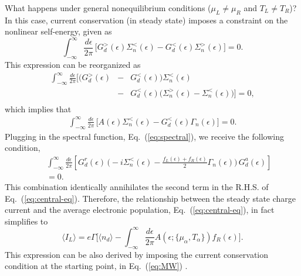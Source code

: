 \documentclass[aps,pra,twocolumn,groupedaddress,showpacs,superscriptaddress,amssymb,amsmath]{revtex4-1}
\newcommand{\be}{\begin{equation}}
\newcommand{\ee}{\end{equation}}
\newcommand{\bea}{\begin{eqnarray}}
\newcommand{\eea}{\end{eqnarray}}
\begin{document}
What happens under general nonequilibrium conditions ($\mu_L \!\neq\! \mu_R$ and $T_L \neq T_R$)? 
In this case, current conservation (in steady state) imposes a constraint on the nonlinear self-energy, 
given as \cite{Haug-book}
%
\be
\!\!\int_{-\infty}^{\infty} \frac{d\epsilon}{2\pi} \, \Big[G_d^{>}(\epsilon) \Sigma_{n}^{<}(\epsilon) - G_d^{<}(\epsilon) \Sigma_{n}^{>}(\epsilon)\Big]=0.
\ee
%
This expression can be reorganized as 
%
\bea
\!\!\int_{-\infty}^{\infty} \!\!\frac{d\epsilon}{2\pi}\Big[\Big(G_d^{>}(\epsilon)\!&-&\!G_d^{<}(\epsilon)\Big) \Sigma_{n}^{<}(\epsilon) \nonumber \\
\!&-&\! G_d^{<}(\epsilon) \Big(\Sigma_{n}^{>}(\epsilon)\!-\!\Sigma_{n}^{<}(\epsilon)\Big)\Big]=0,
\nonumber\\
\eea
%
which implies that
%
\bea
\int_{-\infty}^{\infty} \frac{d\epsilon}{2\pi} \, 
\Big[A(\epsilon) \Sigma_{n}^{<}(\epsilon)-G_d^{<}(\epsilon) \Gamma_n(\epsilon)\Big]=0.
\eea
%
Plugging in the spectral function, Eq.~(\ref{eq:spectral}), we
receive the following condition,
%
\bea
&&\int_{-\infty}^{\infty} \frac{d\epsilon}{2\pi } \left[ G_d^r(\epsilon) \, \Big(-i \Sigma_n^{<}(\epsilon) - \frac{f_L(\epsilon) + f_R(\epsilon)}{2} \Gamma_n(\epsilon) \Big)\, G_d^a(\epsilon) \right]
\nonumber\\
&&=0.
\label{eq:cond}
\eea
%
This combination identically annihilates the second term in the R.H.S. of Eq.~(\ref{eq:central-eq}). 
Therefore, the relationship between the steady state charge current and the average electronic population, 
Eq.~(\ref{eq:central-eq}), in fact simplifies to 
%
\be
\langle I_L \rangle =e \Gamma \Big[\langle n_d\rangle-\int_{-\infty}^{\infty} \frac{d\epsilon}{2\pi }   A(\epsilon; \{\mu_{\alpha},T_{\alpha}\})  f_R(\epsilon) \Big].
\label{eq:cur-pop}
\ee
%
This expression can be also derived by imposing the current conservation condition at the starting point, in Eq.~(\ref{eq:MW}) \cite{Ness,NessC}.
\end{document}
